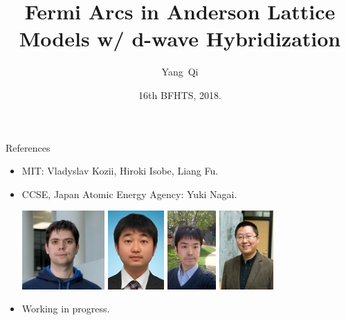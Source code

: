 \documentclass[xcolor=table, 10pt, aspectratio=169]{beamer}
\title[Fermi Arcs] %
{Fermi Arcs in Anderson Lattice Models w/ d-wave Hybridization}
\author[Y Qi] %
{Yang~Qi}
\institute[Fudan] %
{Department of Physics, Fudan University}
\date{16th BFHTS, 2018.}
\begin{document}
\begin{frame}
  \titlepage
\end{frame}

\begin{frame}{References}
\begin{itemize}
\item MIT: Vladyslav Kozii, Hiroki Isobe, Liang Fu.
\item CCSE, Japan Atomic Energy Agency: Yuki Nagai.
\begin{center}
	\includegraphics[height=3cm]{../people/vlad}
	\includegraphics[height=3cm]{../people/yuki}
	\includegraphics[height=3cm]{../people/hiroki}
	\includegraphics[height=3cm]{../people/liangfu}
\end{center}
\item Working in progress.
\end{itemize}
\end{frame}
\end{document}
